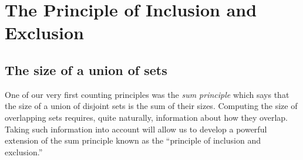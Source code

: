 \documentclass[10pt,]{book}
\theoremstyle{plain}
\theoremstyle{definition}
\numberwithin{equation}{chapter}
\begin{document}
\chapter[{The Principle of Inclusion and Exclusion}]{The Principle of Inclusion and Exclusion}\label{ch_inclexcl}
\typeout{************************************************}
\typeout{************************************************}
\section[{The size of a union of sets}]{The size of a union of sets}\label{sec_inclexcl-sizeunion}
One of our very first counting principles was the \emph{sum principle} which says that the size of a union of disjoint sets is the sum of their sizes. Computing the size of overlapping sets requires, quite naturally, information about how they overlap. Taking such information into account will allow us to develop a powerful extension of the sum principle known as the ``principle of inclusion and exclusion.''%
\typeout{************************************************}
\typeout{************************************************}
\end{document}
